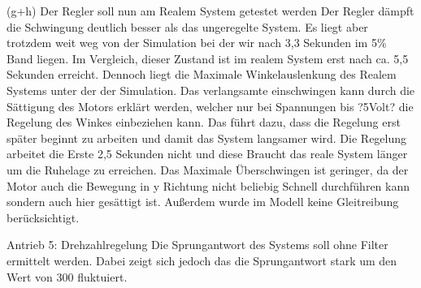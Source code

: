 \documentclass[10pt]{scrartcl}
\begin{document}
(g+h) Der Regler soll nun am Realem System getestet werden
Der Regler dämpft die Schwingung deutlich besser als das ungeregelte System. Es liegt aber trotzdem weit weg von der Simulation bei der wir nach 3,3 Sekunden im 5\% Band liegen. Im Vergleich, dieser Zustand ist im realem System erst nach ca. 5,5 Sekunden erreicht. Dennoch liegt die Maximale Winkelauslenkung des Realem Systems unter der der Simulation. Das verlangsamte einschwingen kann durch die Sättigung des Motors erklärt werden, welcher nur bei Spannungen bis ?5Volt? die Regelung des Winkes einbeziehen kann. Das führt dazu, dass die Regelung erst später beginnt zu arbeiten und damit das System langsamer wird. Die Regelung arbeitet die Erste 2,5 Sekunden nicht und diese Braucht das reale System länger um die Ruhelage zu erreichen. Das Maximale Überschwingen ist geringer, da der Motor auch die Bewegung in y Richtung nicht beliebig Schnell durchführen kann sondern auch hier gesättigt ist. Außerdem wurde im Modell keine Gleitreibung berücksichtigt.

Antrieb 
5: Drehzahlregelung
	Die Sprungantwort des Systems soll ohne Filter ermittelt werden. Dabei zeigt sich jedoch das die Sprungantwort stark um den Wert von 300 fluktuiert.
 
\end{document}
